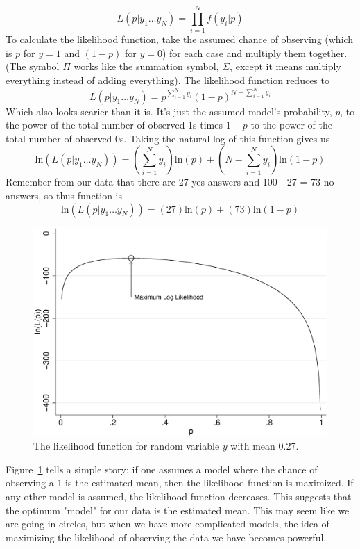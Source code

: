 \begin{equation}
L\left(p \vert y_1 \ldots y_N\right)=\prod_{i=1}^Nf\left(y_i|p\right)
\end{equation}
To calculate the likelihood function, take the assumed chance of observing (which is $p$ for $y = 1$ and $(1 - p)$ for $y = 0$) for each case and multiply them together. (The symbol $\Pi$ works like the summation symbol, $\Sigma$, except it means multiply everything instead of adding everything). The likelihood function reduces to
\begin{equation}\label{eq:plikelihood}
L\left(p \vert y_1 \ldots y_N\right)=p^{\sum_{i=1}^Ny_i}\left(1-p\right)^{N-\sum_{i=1}^Ny_i}
\end{equation}
Which also looks scarier than it is. It's just the assumed model's probability, $p$, to the power of the total number of observed 1s times $1 - p$ to the power of the total number of observed 0s. Taking the natural log of this function gives us
\begin{equation}
\mbox{ln}\left(L\left(p \vert y_1 \ldots y_N\right)\right)=\left(\sum_{i=1}^Ny_i\right)\mbox{ln}\left(p\right)+\left(N-\sum_{i=1}^Ny_i\right)\mbox{ln}\left(1-p\right)
\end{equation}
Remember from our data that there are 27 yes answers and 100 - 27 = 73 no answers, so thus function is
\[
\mbox{ln}\left(L\left(p \vert y_1 \ldots y_N\right)\right)=\left(27\right)\mbox{ln}\left(p\right)+\left(73\right)\mbox{ln}\left(1-p\right)
\]
\begin{figure}
   \centering
   \includegraphics[angle=0,
           width=.75\textwidth]{ll.eps}
   \caption{The likelihood function for random variable $y$ with mean 0.27.}
  \label{fig:ll}
\end{figure}
Figure~\ref{fig:ll} tells a simple story: if one assumes a model where the chance of observing a 1 is the estimated mean, then the likelihood function is maximized. If any other model is assumed, the likelihood function decreases. This suggests that the optimum "model" for our data is the estimated mean. This may seem like we are going in circles, but when we have more complicated models, the idea of maximizing the likelihood of observing the data we have becomes powerful.

